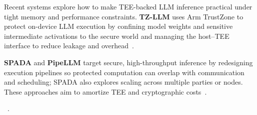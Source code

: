 
Recent systems explore how to make TEE-backed LLM inference practical under tight memory and performance constraints. \textbf{TZ-LLM} uses Arm TrustZone to protect on-device LLM execution by confining model weights and sensitive intermediate activations to the secure world and managing the host--TEE interface to reduce leakage and overhead~\cite{wang2025tz}.

\textbf{SPADA} and \textbf{PipeLLM} target secure, high-throughput inference by redesigning execution pipelines so protected computation can overlap with communication and scheduling; SPADA also explores scaling across multiple parties or nodes. These approaches aim to amortize TEE and cryptographic costs~\cite{chu2025spada,tan2025pipellm}.

~.

